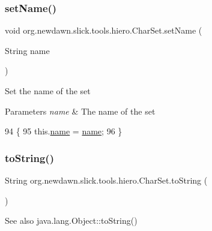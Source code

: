 \subsubsection{\texorpdfstring{set\+Name()}{setName()}}
{\footnotesize\ttfamily void org.\+newdawn.\+slick.\+tools.\+hiero.\+Char\+Set.\+set\+Name (\begin{DoxyParamCaption}\item[{String}]{name }\end{DoxyParamCaption})\hspace{0.3cm}{\ttfamily [inline]}}

Set the name of the set


\begin{DoxyParams}{Parameters}
{\em name} & The name of the set \\
\hline
\end{DoxyParams}

\begin{DoxyCode}
94                                      \{
95         this.\mbox{\hyperlink{classorg_1_1newdawn_1_1slick_1_1tools_1_1hiero_1_1_char_set_aff26a369817bc815327582f0b7ac215e}{name}} = \mbox{\hyperlink{classorg_1_1newdawn_1_1slick_1_1tools_1_1hiero_1_1_char_set_aff26a369817bc815327582f0b7ac215e}{name}};
96     \}
\end{DoxyCode}
\mbox{\label{classorg_1_1newdawn_1_1slick_1_1tools_1_1hiero_1_1_char_set_a63b12aabf40d0455fbfd17970753af46}} 
\subsubsection{\texorpdfstring{to\+String()}{toString()}}
{\footnotesize\ttfamily String org.\+newdawn.\+slick.\+tools.\+hiero.\+Char\+Set.\+to\+String (\begin{DoxyParamCaption}{ }\end{DoxyParamCaption})\hspace{0.3cm}{\ttfamily [inline]}}

\begin{DoxySeeAlso}{See also}
java.\+lang.\+Object\+::to\+String() 
\end{DoxySeeAlso}

